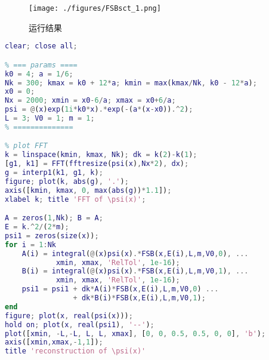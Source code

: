 
\begin{issues}
\issueDraft
{}
\end{issues}


\begin{figure}[ht]
\centering
\texttt{[image: ./figures/FSBsct\_1.png]}
\caption{运行结果} \label{FSBsct_fig1}
\end{figure}

\begin{lstlisting}[language=matlab, caption=FSBsct.m]
% 使用类 sin，cos 基底
clear; close all;

% === params ====
k0 = 4; a = 1/6;
Nk = 300; kmax = k0 + 12*a; kmin = max(kmax/Nk, k0 - 12*a);
x0 = 0;
Nx = 2000; xmin = x0-6/a; xmax = x0+6/a;
psi = @(x)exp(1i*k0*x).*exp(-(a*(x-x0)).^2);
L = 3; V0 = 1; m = 1;
% ==============

% plot FFT
k = linspace(kmin, kmax, Nk); dk = k(2)-k(1);
[g1, k1] = FFT(fftresize(psi(x),Nx*2), dx);
g = interp1(k1, g1, k);
figure; plot(k, abs(g), '.');
axis([kmin, kmax, 0, max(abs(g))*1.1]);
xlabel k; title 'FFT of \psi(x)';

A = zeros(1,Nk); B = A;
E = k.^2/(2*m);
psi1 = zeros(size(x));
for i = 1:Nk
    A(i) = integral(@(x)psi(x).*FSB(x,E(i),L,m,V0,0), ...
            xmin, xmax, 'RelTol', 1e-16);
    B(i) = integral(@(x)psi(x).*FSB(x,E(i),L,m,V0,1), ...
            xmin, xmax, 'RelTol', 1e-16);
    psi1 = psi1 + dk*A(i)*FSB(x,E(i),L,m,V0,0) ...
                + dk*B(i)*FSB(x,E(i),L,m,V0,1);
end
figure; plot(x, real(psi(x)));
hold on; plot(x, real(psi1), '--');
plot([xmin, -L,-L, L, L, xmax], [0, 0, 0.5, 0.5, 0, 0], 'b');
axis([xmin,xmax,-1,1]);
title 'reconstruction of \psi(x)'
\end{lstlisting}

